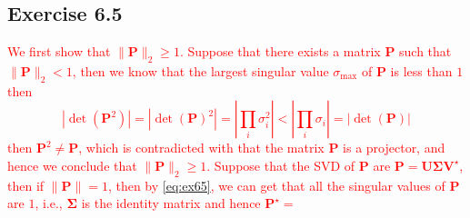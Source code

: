 \documentclass{article}
\begin{document}
\subsection{Exercise 6.5}
\textcolor{red}{We first show that $\| \bm{P} \|_2 \geq 1$. Suppose that there exists a matrix $\bm{P} $ such that $\| \bm{P} \|_2 < 1$, then we know that the largest singular value $\sigma_{\max} $ of $\bm{P}$ is less than $1$ then 
\begin{equation}
|\det (\bm{P}^2 ) | = |\det (\bm{P} ) ^2| = |\prod_i \sigma_i^2| < |\prod_i \sigma_i| = |\det (\bm{P} )|
\label{eq:ex65}
\end{equation}
then $\bm{P}^2 \neq \bm{P}$, which is contradicted with that the matrix $\bm{P}$ is a projector, and hence we conclude that $\| \bm{P}\|_2 \geq 1$. Suppose that the SVD of $\bm{P}$ are $\bm{P} = \bm{U} \bm{\Sigma} \bm{V}^\star$, then if $\| \bm{P} \| = 1$, then by \eqref{eq:ex65}, we can  get that all the singular values of $\bm{P}$ are $1$, i.e., $\bm{\Sigma}$ is the identity matrix and hence $\bm{P}^\star =  $}
\end{document}
